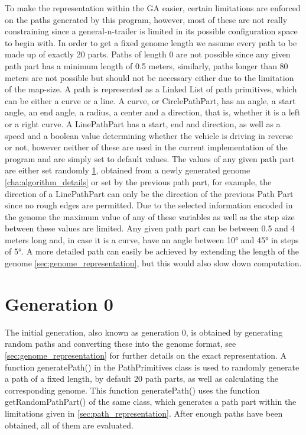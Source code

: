 To make the representation within the GA easier, certain limitations are enforced on the paths generated by this program, however, most of these are not really constraining since a general-n-trailer is limited in its possible configuration space to begin with. In order to get a fixed genome length we assume every path to be made up of exactly 20 parts. Paths of length 0 are not possible since any given path part has a minimum length of 0.5 meters, similarly, paths longer than 80 meters are not possible but should not be necessary either due to the limitation of the map-size.
A path is represented as a Linked List of path primitives, which can be either a curve or a line. A curve, or CirclePathPart, has an angle, a start angle, an end angle, a radius, a center and a direction, that is, whether it is a left or a right curve. A LinePathPart has a start, end and direction, as well as a speed and a boolean value determining whether the vehicle is driving in reverse or not, however neither of these are used in the current implementation of the program and are simply set to default values. The values of any given path part are either set randomly \ref{sec:generation_0}, obtained from a newly generated genome \ref{cha:algorithm_details} or set by the previous path part, for example, the direction of a LinePathPart can only be the direction of the previous Path Part since no rough edges are permitted.
Due to the selected information encoded in the genome the maximum value of any of these variables as well as the step size between these values are limited. Any given  path part can be between 0.5 and 4 meters long and, in case it is a curve, have an angle between 10° and 45° in steps of 5°. A more detailed path can easily be achieved by extending the length of the genome \ref{sec:genome_representation}, but this would also slow down computation.

\section{Generation 0} %
\label{sec:generation_0}

The initial generation, also known as generation 0, is obtained by generating random paths and converting these into the genome format, see \ref{sec:genome_representation} for further details on the exact representation. A function generatePath() in the PathPrimitives class is used to randomly generate a path of a fixed length, by default 20 path parts, as well as calculating the corresponding genome. This function generatePath() uses the function getRandomPathPart() of the same class, which generates a path part within the limitations given in \ref{sec:path_representation}.
After enough paths have been obtained, all of them are evaluated.

